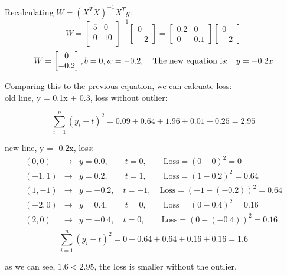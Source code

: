 \documentclass[a4paper,12pt]{article}
\begin{document}
\begin{enumerate}[label=\alph*)]
    Recalculating $W = (X^T X)^{-1} X^T y$:
    \[
    W = \begin{bmatrix}
        5 & 0 \\
        0 & 10 \\
    \end{bmatrix}^{-1} \begin{bmatrix}
        0 \\
        -2
    \end{bmatrix} = \begin{bmatrix}
        0.2 & 0 \\
        0 & 0.1
    \end{bmatrix} \begin{bmatrix}
        0 \\
        -2
    \end{bmatrix} 
    \]
    \[
    W = \begin{bmatrix}
        0\\
        -0.2
    \end{bmatrix}, b = 0, w = -0.2, \\
    \quad \text{The new equation is:} \quad y = -0.2x
    \]

    Comparing this to the previous equation, we can calcuate loss:\\
    old line, y = 0.1x + 0.3, loss without outlier:

    \[
    \sum_{i=1}^{n} (y_i -t)^2 = 0.09 + 0.64 + 1.96 + 0.01 +0.25 = 2.95
    \]

    new line, y = -0.2x, loss:
    \[
    \begin{array}{rcl}
        (0,0)   &\rightarrow& y = 0.0,  \quad\quad t = 0,   \quad\quad \text{Loss} = (0 - 0)^2 = 0 \\
        (-1,1)  &\rightarrow& y = 0.2,  \quad\quad t = 1,   \quad\quad \text{Loss} = (1 - 0.2)^2 = 0.64 \\
        (1,-1)  &\rightarrow& y = -0.2, \quad t = -1,       \quad \text{Loss} = (-1 - (-0.2))^2 = 0.64 \\
        (-2,0)  &\rightarrow& y = 0.4,  \quad\quad t = 0,   \quad\quad \text{Loss} = (0 - 0.4)^2 = 0.16 \\
        (2,0)   &\rightarrow& y = -0.4, \quad t = 0,        \quad\quad \text{Loss} = (0 - (-0.4))^2 = 0.16 \\
    \end{array}
    \]
    \[
    \sum_{i=1}^{n} (y_i -t)^2 = 0 + 0.64 + 0.64 + 0.16 + 0.16 = 1.6
    \]

    as we can see, $1.6 < 2.95$, the loss is smaller without the outlier.
   

\end{enumerate}
\end{document}
